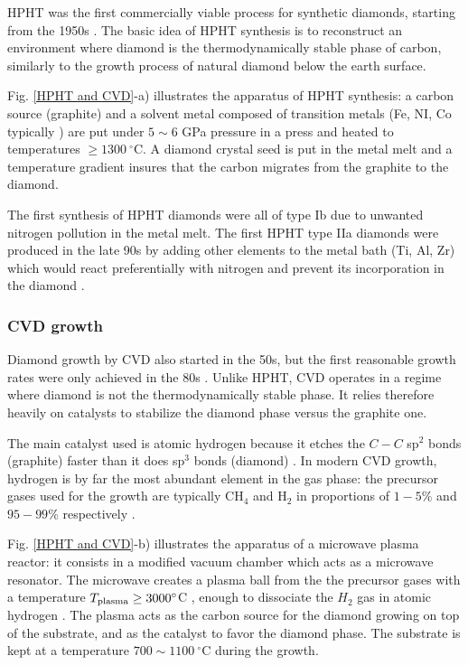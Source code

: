 \documentclass[a4paper,11pt]{report}
\begin{document}
HPHT was the first commercially viable process for synthetic diamonds, starting from the 1950s \citep{barnard2000diamond, bundy1955man}. The basic idea of HPHT synthesis is to reconstruct an environment where diamond is the thermodynamically stable phase of carbon, similarly to the growth process of natural diamond below the earth surface. 

Fig. \ref{HPHT and CVD}-a) illustrates the apparatus of HPHT synthesis: a carbon source (graphite) and a solvent metal composed of transition metals (Fe, NI, Co typically \citep{bundy1963direct}) are put under $5 \sim 6$ GPa pressure in a press and heated to temperatures $\geq 1300\ ^\circ$C. A diamond crystal seed is put in the metal melt and a temperature gradient insures that the carbon migrates from the graphite to the diamond.

The first synthesis of HPHT diamonds were all of type Ib due to unwanted nitrogen pollution in the metal melt. The first HPHT type IIa diamonds were produced in the late 90s by adding other elements to the metal bath (Ti, Al, Zr) which would react preferentially with nitrogen and prevent its incorporation in the diamond \citep{burns1999growth, sumiya2002growth}.

\subsubsection{CVD growth}

Diamond growth by CVD also started in the 50s, but the first reasonable growth rates were only achieved in the 80s \citep{matsumoto1982growth, matsumoto1982vapor, kamo1983diamond}. Unlike HPHT, CVD operates in a regime where diamond is not the thermodynamically stable phase. It relies therefore heavily on catalysts to stabilize the diamond phase versus the graphite one. 

The main catalyst used is atomic hydrogen because it etches the $C-C$ sp$^2$ bonds (graphite) faster than it does sp$^3$ bonds (diamond) \citep{gracio2010diamond}. In modern CVD growth, hydrogen is by far the most abundant element in the gas phase: the precursor gases used for the growth are typically CH$_4$ and H$_2$ in proportions of $1-5\%$ and $95-99\%$ respectively \citep{achard2020chemical}.

Fig. \ref{HPHT and CVD}-b) illustrates the apparatus of a microwave plasma reactor: it consists in a modified vacuum chamber which acts as a microwave resonator. The microwave creates a plasma ball from the the precursor gases with a temperature $T_{\rm plasma} \geq 3000 ^\circ$C \citep{ashfold2020nitrogen}, enough to dissociate the $H_2$ gas in atomic hydrogen \citep{balmer2009chemical}. The plasma acts as the carbon source for the diamond growing on top of the substrate, and as the catalyst to favor the diamond phase. The substrate is kept at a temperature $700 \sim 1100\ ^\circ$C during the growth.
\end{document}
